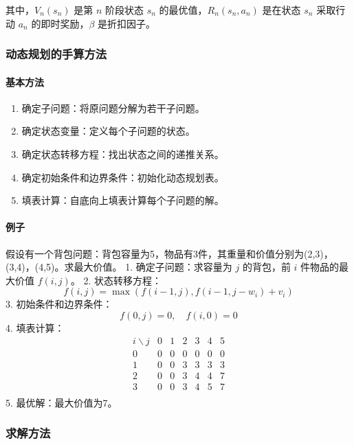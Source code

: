 \documentclass[UTF8]{ctexart}
\begin{document}
其中，\( V_n(s_n) \) 是第 \( n \) 阶段状态 \( s_n \) 的最优值，\( R_n(s_n, a_n) \) 是在状态 \( s_n \) 采取行动 \( a_n \) 的即时奖励，\( \beta \) 是折扣因子。

\subsubsection{动态规划的手算方法}
\paragraph{基本方法}
\begin{enumerate}
    \item 确定子问题：将原问题分解为若干子问题。
    \item 确定状态变量：定义每个子问题的状态。
    \item 确定状态转移方程：找出状态之间的递推关系。
    \item 确定初始条件和边界条件：初始化动态规划表。
    \item 填表计算：自底向上填表计算每个子问题的解。
\end{enumerate}

\paragraph{例子}
假设有一个背包问题：背包容量为5，物品有3件，其重量和价值分别为(2,3)，(3,4)，(4,5)。求最大价值。
1. 确定子问题：求容量为 \( j \) 的背包，前 \( i \) 件物品的最大价值 \( f(i, j) \)。
2. 状态转移方程：
    \[
    f(i, j) = \max(f(i-1, j), f(i-1, j-w_i) + v_i)
    \]
3. 初始条件和边界条件：
    \[
    f(0, j) = 0, \quad f(i, 0) = 0
    \]
4. 填表计算：
   \[
    \begin{array}{c|cccccc}
    i \backslash j & 0 & 1 & 2 & 3 & 4 & 5 \\
    \hline
    0 & 0 & 0 & 0 & 0 & 0 & 0 \\
    1 & 0 & 0 & 3 & 3 & 3 & 3 \\
    2 & 0 & 0 & 3 & 4 & 4 & 7 \\
    3 & 0 & 0 & 3 & 4 & 5 & 7 \\
    \end{array}
    \]
5. 最优解：最大价值为7。


\subsubsection {求解方法}
\end{document}

